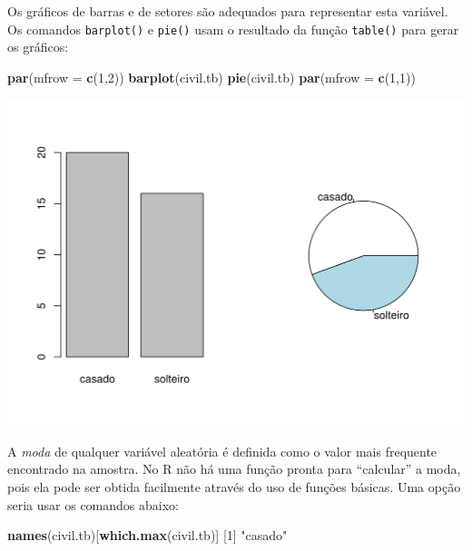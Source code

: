 \documentclass[10pt,a4paper]{book}
\newenvironment{Shaded}{\begin{snugshade}}{\end{snugshade}}
\newcommand{\KeywordTok}[1]{\textcolor[rgb]{0.13,0.29,0.53}{\textbf{#1}}}
\newcommand{\DataTypeTok}[1]{\textcolor[rgb]{0.13,0.29,0.53}{#1}}
\newcommand{\DecValTok}[1]{\textcolor[rgb]{0.00,0.00,0.81}{#1}}
\newcommand{\StringTok}[1]{\textcolor[rgb]{0.31,0.60,0.02}{#1}}
\newcommand{\NormalTok}[1]{#1}
\begin{document}
Os gráficos de barras e de setores são adequados para representar esta
variável. Os comandos \texttt{barplot()} e \texttt{pie()} usam o
resultado da função \texttt{table()} para gerar os gráficos:

\begin{Shaded}
\begin{Highlighting}[]
\KeywordTok{par}\NormalTok{(}\DataTypeTok{mfrow =} \KeywordTok{c}\NormalTok{(}\DecValTok{1}\NormalTok{,}\DecValTok{2}\NormalTok{))}
\KeywordTok{barplot}\NormalTok{(civil.tb)}
\KeywordTok{pie}\NormalTok{(civil.tb)}
\KeywordTok{par}\NormalTok{(}\DataTypeTok{mfrow =} \KeywordTok{c}\NormalTok{(}\DecValTok{1}\NormalTok{,}\DecValTok{1}\NormalTok{))}
\end{Highlighting}
\end{Shaded}

\begin{center}\includegraphics{figures/unnamed-chunk-292-1} \end{center}

A \emph{moda} de qualquer variável aleatória é definida como o valor
mais frequente encontrado na amostra. No R não há uma função pronta para
``calcular'' a moda, pois ela pode ser obtida facilmente através do uso
de funções básicas. Uma opção seria usar os comandos abaixo:

\begin{Shaded}
\begin{Highlighting}[]
\KeywordTok{names}\NormalTok{(civil.tb)[}\KeywordTok{which.max}\NormalTok{(civil.tb)]}
\NormalTok{[}\DecValTok{1}\NormalTok{] }\StringTok{"casado"}
\end{Highlighting}
\end{Shaded}
\end{document}
